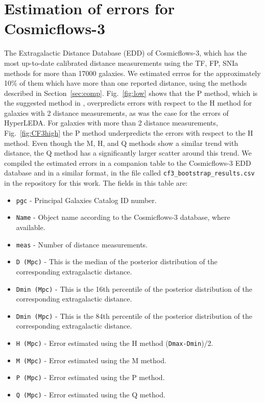 \documentclass[a4paper,fleqn,usenatbib]{mnras}
\begin{document}
\section{Estimation of errors for Cosmicflows-3}
The Extragalactic Distance Database (EDD) of Cosmicflows-3, which has the most up-to-date calibrated distance measurements using the TF, FP, SNIa methods for more than 17000 galaxies. We estimated errros for the approximately 10\% of them which have more than one reported distance, using the methods described in Section~\ref{sec:comp}. Fig.~\ref{fig:low} shows that the P method, which is the suggested method in \citet{cosmicflows}, overpredicts errors with respect to the H method for galaxies with 2 distance measurements, as was the case for the errors of HyperLEDA. For galaxies with more than 2 distance measurements, Fig.~\ref{fig:CF3high} the P method underpredicts the errors with respect to the H method. Even though the M, H, and Q methods show a similar trend with distance, the Q method has a significantly larger scatter around this trend. We compiled the estimated errors in a companion table to the Cosmicflows-3 EDD database and in a similar format, in the file called \texttt{cf3\_bootstrap\_results.csv} in the repository for this work. The fields in this table are:
\begin{itemize}
\item \texttt{pgc} - Principal Galaxies Catalog ID number.
\item \texttt{Name} - Object name according to the Cosmicflows-3 database, where available.
\item \texttt{meas} - Number of distance measurements.
\item \texttt{D (Mpc)} - This is the median of the posterior distribution of the corresponding extragalactic distance.
\item \texttt{Dmin (Mpc)} - This is the 16th percentile of the posterior distribution of the corresponding extragalactic distance.
\item \texttt{Dmin (Mpc)} - This is the 84th percentile of the posterior distribution of the corresponding extragalactic distance.
\item \texttt{H (Mpc)} - Error estimated using the H method (\texttt{Dmax-Dmin})/2.
\item \texttt{M (Mpc)} - Error estimated using the M method. 
\item \texttt{P (Mpc)} - Error estimated using the P method. 
\item \texttt{Q (Mpc)} - Error estimated using the Q method. 
\end{itemize}
\end{document}
